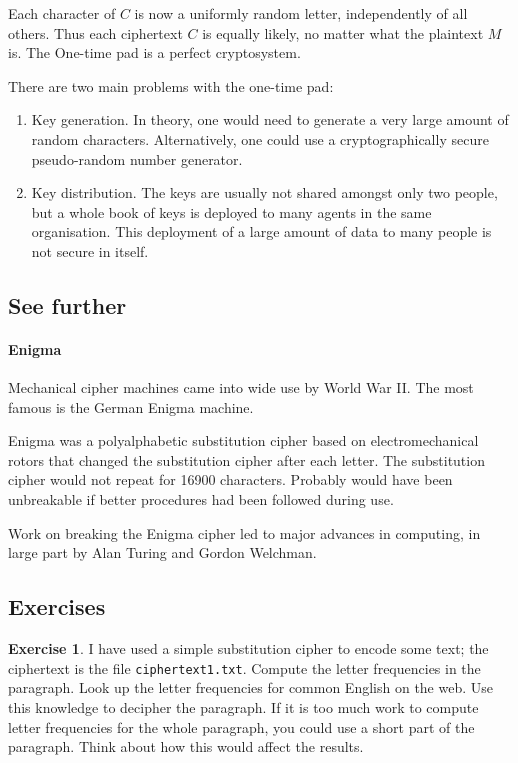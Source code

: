 \documentclass[a4paper, 11pt, openany]{book}
\numberwithin{equation}{section}
\theoremstyle{plain}
\theoremstyle{definition}
\newtheorem{exercise}   {Exercise}  [section]
\begin{document}
Each character of $C$ is now a uniformly random letter, independently of all others. Thus each ciphertext $C$ is equally likely, no matter what the plaintext $M$ is. The One-time pad is a perfect cryptosystem.

There are two main problems with the one-time pad:
\begin{enumerate}
    \item Key generation. In theory, one would need to generate a very large amount of random characters. Alternatively, one could use a cryptographically secure pseudo-random number generator.
    
    \item Key distribution. The keys are usually not shared amongst only two people, but a whole book of keys is deployed to many agents in the same organisation. This deployment of a large amount of data to many people is not secure in itself.
\end{enumerate}




\subsection{See further}

\paragraph{Enigma}
Mechanical cipher machines came into wide use by World War II. The most famous is the German Enigma machine.

Enigma was a polyalphabetic substitution cipher based on electromechanical rotors that changed the substitution cipher after each letter. The substitution cipher would not repeat for 16900 characters. Probably would have been unbreakable if better procedures had been followed during use.

Work on breaking the Enigma cipher led to major advances in computing, in large part by Alan Turing and Gordon Welchman. 




\subsection{Exercises}

\begin{exercise} \label{exercise:substitution1}
I have used a simple substitution cipher to encode some text; the ciphertext is the file \texttt{ciphertext1.txt}. Compute the letter frequencies in the paragraph. Look up the letter frequencies for common English on the web. Use this knowledge to decipher the paragraph. If it is too much work to compute letter frequencies for the whole paragraph, you could use a short part of the paragraph. Think about how this would affect the results.
\end{exercise}
\end{document}
